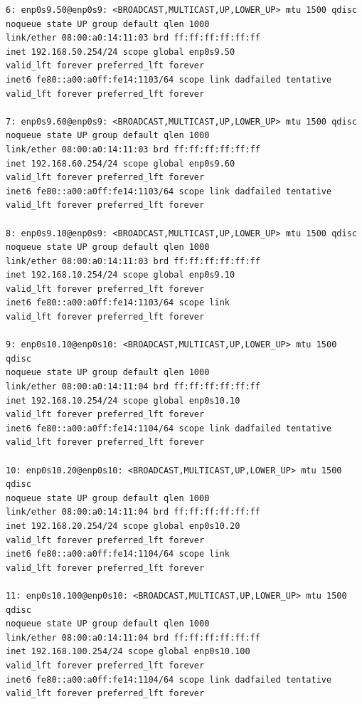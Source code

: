\documentclass[a4paper,12pt,openany]{report}
\begin{document}
\begin{appendices}
\begin{verbatim}
6: enp0s9.50@enp0s9: <BROADCAST,MULTICAST,UP,LOWER_UP> mtu 1500 qdisc 
noqueue state UP group default qlen 1000
link/ether 08:00:a0:14:11:03 brd ff:ff:ff:ff:ff:ff
inet 192.168.50.254/24 scope global enp0s9.50
valid_lft forever preferred_lft forever
inet6 fe80::a00:a0ff:fe14:1103/64 scope link dadfailed tentative 
valid_lft forever preferred_lft forever

7: enp0s9.60@enp0s9: <BROADCAST,MULTICAST,UP,LOWER_UP> mtu 1500 qdisc 
noqueue state UP group default qlen 1000
link/ether 08:00:a0:14:11:03 brd ff:ff:ff:ff:ff:ff
inet 192.168.60.254/24 scope global enp0s9.60
valid_lft forever preferred_lft forever
inet6 fe80::a00:a0ff:fe14:1103/64 scope link dadfailed tentative 
valid_lft forever preferred_lft forever

8: enp0s9.10@enp0s9: <BROADCAST,MULTICAST,UP,LOWER_UP> mtu 1500 qdisc 
noqueue state UP group default qlen 1000
link/ether 08:00:a0:14:11:03 brd ff:ff:ff:ff:ff:ff
inet 192.168.10.254/24 scope global enp0s9.10
valid_lft forever preferred_lft forever
inet6 fe80::a00:a0ff:fe14:1103/64 scope link 
valid_lft forever preferred_lft forever

9: enp0s10.10@enp0s10: <BROADCAST,MULTICAST,UP,LOWER_UP> mtu 1500 qdisc 
noqueue state UP group default qlen 1000
link/ether 08:00:a0:14:11:04 brd ff:ff:ff:ff:ff:ff
inet 192.168.10.254/24 scope global enp0s10.10
valid_lft forever preferred_lft forever
inet6 fe80::a00:a0ff:fe14:1104/64 scope link dadfailed tentative 
valid_lft forever preferred_lft forever

10: enp0s10.20@enp0s10: <BROADCAST,MULTICAST,UP,LOWER_UP> mtu 1500 qdisc 
noqueue state UP group default qlen 1000
link/ether 08:00:a0:14:11:04 brd ff:ff:ff:ff:ff:ff
inet 192.168.20.254/24 scope global enp0s10.20
valid_lft forever preferred_lft forever
inet6 fe80::a00:a0ff:fe14:1104/64 scope link 
valid_lft forever preferred_lft forever

11: enp0s10.100@enp0s10: <BROADCAST,MULTICAST,UP,LOWER_UP> mtu 1500 qdisc 
noqueue state UP group default qlen 1000
link/ether 08:00:a0:14:11:04 brd ff:ff:ff:ff:ff:ff
inet 192.168.100.254/24 scope global enp0s10.100
valid_lft forever preferred_lft forever
inet6 fe80::a00:a0ff:fe14:1104/64 scope link dadfailed tentative 
valid_lft forever preferred_lft forever
            \end{verbatim}


\end{appendices}
\end{document}
